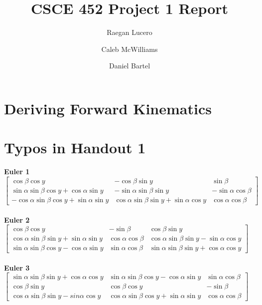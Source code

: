 \documentclass{article}
\title{CSCE 452 Project 1 Report}
\author{Raegan Lucero
\and
 Caleb McWilliams
\and
 Daniel Bartel}
\date{}
\begin{document}
\maketitle

\section*{Deriving Forward Kinematics}



\section*{Typos in Handout 1}
\textbf{Euler 1}
$
\begin{bmatrix}
\cos\beta\cos y & -\cos\beta\sin y & \sin\beta \\

\sin\alpha\sin\beta\cos y + \cos\alpha\sin y & -\sin\alpha\sin\beta\sin y & -\sin\alpha\cos\beta \\

-\cos\alpha\sin\beta\cos y + \sin\alpha\sin y & \cos\alpha\sin\beta\sin y + \sin\alpha\cos y & \cos\alpha\cos\beta
\end{bmatrix}
$
\\ \ \\
\textbf{Euler 2}
$
\begin{bmatrix}
\cos\beta\cos y & -\sin\beta & \cos\beta\sin y \\

\cos\alpha\sin\beta\sin y + \sin\alpha\sin y & \cos\alpha\cos\beta & \cos\alpha\sin\beta\sin y - \sin\alpha\cos y \\

\sin\alpha\sin\beta\cos y - \cos\alpha\sin y & \sin\alpha\cos\beta & \sin\alpha\sin\beta\sin y + \cos\alpha\cos y
\end{bmatrix}
$
\\ \ \\
\textbf{Euler 3}
$
\begin{bmatrix}
\sin\alpha\sin\beta\sin y + \cos\alpha\cos y & \sin\alpha\sin\beta\cos y - \cos\alpha\sin y & \sin\alpha\cos\beta \\

\cos\beta\sin y & \cos\beta\cos y & -\sin\beta \\
\cos\alpha\sin\beta\sin y - sin\alpha\cos y & \cos\alpha\sin\beta\cos y + \sin\alpha\sin y & \cos\alpha\cos\beta
\end{bmatrix}
$
\\ \ \\
\end{document}
